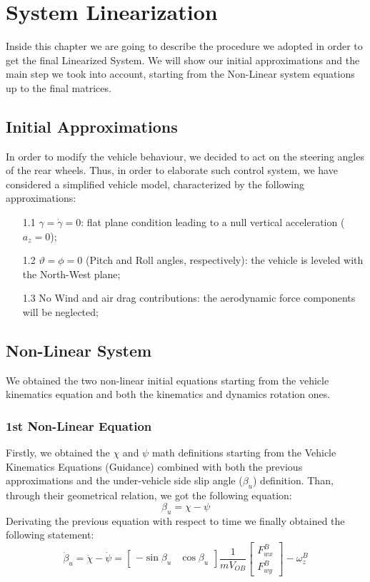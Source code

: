 
\chapter{System Linearization}
	Inside this chapter we are going to describe the procedure we adopted in order to get the final Linearized System. We will show our initial approximations and the main step we took into account, starting from the Non-Linear system equations up to the final matrices.
\section{Initial Approximations} \label{approx}
	In order to modify the vehicle behaviour, we decided to act on the steering angles of the rear wheels. Thus, in order to elaborate such control system, we have considered a simplified vehicle model, characterized by the following approximations:
		\begin{itemize}
			\item[1.1] $ \gamma=\dot{\gamma}=0 $: flat plane condition leading to a null vertical acceleration ($ a_{z}=0 $);
			\item[1.2] $\vartheta = \phi = 0$ (Pitch and Roll angles, respectively): the vehicle is leveled with the North-West plane;
			\item[1.3] No Wind and air drag contributions: the aerodynamic force components will be neglected;
		\end{itemize}
\section{Non-Linear System}
	We obtained the two non-linear initial equations starting from the vehicle kinematics equation and both the kinematics and dynamics rotation ones.
\subsection{1st Non-Linear Equation}
	Firstly, we obtained the $\chi$ and $\psi$ math definitions starting from the Vehicle Kinematics Equations (Guidance) combined with both the previous approximations and the under-vehicle side slip angle ($\beta_{u}$) definition. Than, through their geometrical relation, we got the following equation:
		\begin{equation}
			\beta_{u} = \chi - \psi
		\end{equation}
	Derivating the previous equation with respect to time we finally obtained the following statement:
		\begin{equation} \label{Betaudot}
			\dot{\beta}_{u} = \dot\chi - \dot\psi =
			\begin{bmatrix}
			- \sin\beta_{u} & \cos\beta_{u}
			\end{bmatrix}
			\frac{1}{mV_{OB}}
			\begin{bmatrix}
			F_{wx}^{B} \\ F_{wy}^{B}
			\end{bmatrix}
			-\omega_{z}^{B}
		\end{equation}
